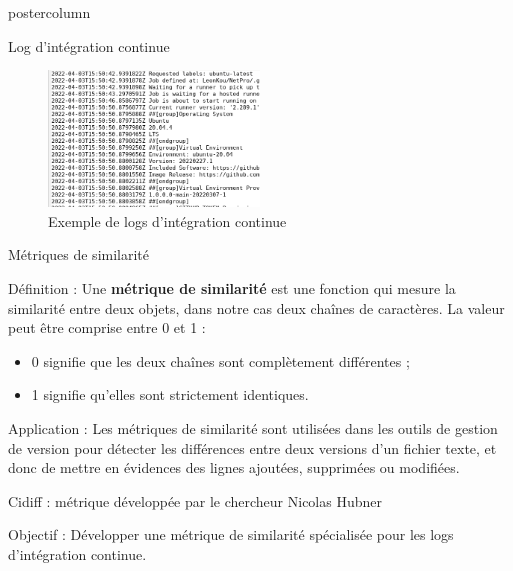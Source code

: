 \begin{frame}
\begin{columns}
\begin{column}{.49\textwidth}
\begin{beamercolorbox}[center,wd=\textwidth]{postercolumn}
\begin{minipage}[T]{.95\textwidth}
{\begin{block}{Log d'intégration continue}
            \begin{figure}[h!]
              \centering
              \includegraphics[width=0.5\textwidth]{sample/example_log.png}
              \caption{Exemple de logs d'intégration continue}
              \label{fig:example_log}
          \end{figure}

            \end{block}

            
            \vfill
            
            \begin{block}{Métriques de similarité}
            
            Définition : Une \textbf{métrique de similarité} est une fonction qui mesure la similarité entre deux objets, dans notre cas deux chaînes de caractères.	La valeur peut être comprise entre 0 et 1 :
            \begin{itemize}
              \item 0 signifie que les deux chaînes sont complètement différentes ;
              \item 1 signifie qu'elles sont strictement identiques.
            \end{itemize}

            Application : Les métriques de similarité sont utilisées dans les outils de gestion de version pour détecter les différences entre deux versions d'un fichier texte, et donc de mettre en évidences des lignes ajoutées, supprimées ou modifiées.
            
            \end{block}
            
            \vfill
            
            \begin{block}{Cidiff : métrique développée par le chercheur Nicolas Hubner}
            
            Objectif : Développer une métrique de similarité spécialisée pour les logs d'intégration continue.
            

\end{block}}
\end{minipage}
\end{beamercolorbox}
\end{column}
\end{columns}
\end{frame}
